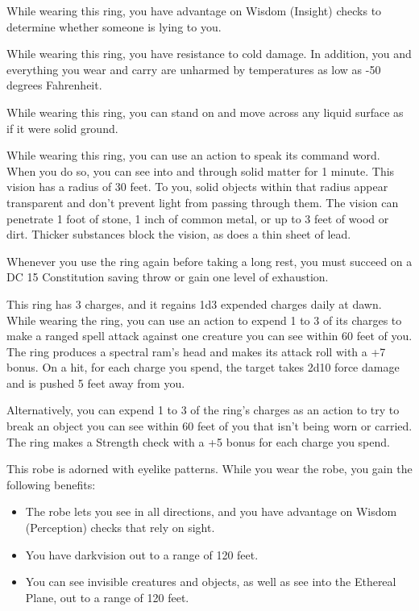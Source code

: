 \documentclass[10pt,a4paper,twoside,bg=print,twocolumn,openany,nodeprecatedcode]{dndbook}
\begin{document}
While wearing this ring, you have advantage on Wisdom (Insight) checks to determine whether someone is lying to you.

While wearing this ring, you have resistance to cold damage. In addition, you and everything you wear and carry are unharmed by temperatures as low as -50 degrees Fahrenheit.

While wearing this ring, you can stand on and move across any liquid surface as if it were solid ground.

While wearing this ring, you can use an action to speak its command word. When you do so, you can see into and through solid matter for 1 minute. This vision has a radius of 30 feet. To you, solid objects within that radius appear transparent and don't prevent light from passing through them. The vision can penetrate 1 foot of stone, 1 inch of common metal, or up to 3 feet of wood or dirt. Thicker substances block the vision, as does a thin sheet of lead.

Whenever you use the ring again before taking a long rest, you must succeed on a DC 15 Constitution saving throw or gain one level of exhaustion.

This ring has 3 charges, and it regains 1d3 expended charges daily at dawn. While wearing the ring, you can use an action to expend 1 to 3 of its charges to make a ranged spell attack against one creature you can see within 60 feet of you. The ring produces a spectral ram's head and makes its attack roll with a +7 bonus. On a hit, for each charge you spend, the target takes 2d10 force damage and is pushed 5 feet away from you.

Alternatively, you can expend 1 to 3 of the ring's charges as an action to try to break an object you can see within 60 feet of you that isn't being worn or carried. The ring makes a Strength check with a +5 bonus for each charge you spend.

This robe is adorned with eyelike patterns. While you wear the robe, you gain the following benefits:


\begin{itemize}
\item The robe lets you see in all directions, and you have advantage on Wisdom (Perception) checks that rely on sight.
\item You have darkvision out to a range of 120 feet.
\item You can see invisible creatures and objects, as well as see into the Ethereal Plane, out to a range of 120 feet.
\end{itemize}
\end{document}

